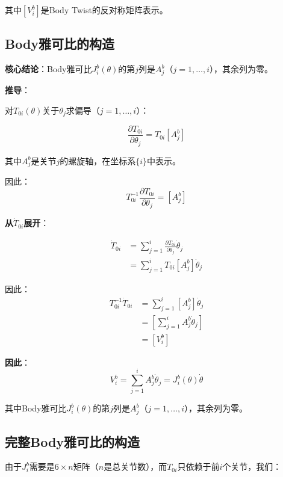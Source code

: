 \documentclass[12pt,a4paper]{article}
\begin{document}
其中$[V_i^b]$是Body Twist的反对称矩阵表示。

\subsection{Body雅可比的构造}

\textbf{核心结论}：Body雅可比$J_i^b(\theta)$的第$j$列是$A_j^b$（$j = 1, \ldots, i$），其余列为零。

\textbf{推导}：

对$T_{0i}(\theta)$关于$\theta_j$求偏导（$j = 1, \ldots, i$）：

\begin{equation}
\frac{\partial T_{0i}}{\partial \theta_j} = T_{0i} [A_j^b]
\label{eq:partial_T}
\end{equation}

其中$A_j^b$是关节$j$的螺旋轴，在坐标系$\{i\}$中表示。

因此：
\begin{equation}
T_{0i}^{-1} \frac{\partial T_{0i}}{\partial \theta_j} = [A_j^b]
\end{equation}

\textbf{从$\dot{T}_{0i}$展开}：

\begin{align}
\dot{T}_{0i} &= \sum_{j=1}^{i} \frac{\partial T_{0i}}{\partial \theta_j} \dot{\theta}_j \\
&= \sum_{j=1}^{i} T_{0i} [A_j^b] \dot{\theta}_j
\end{align}

因此：
\begin{align}
T_{0i}^{-1} \dot{T}_{0i} &= \sum_{j=1}^{i} [A_j^b] \dot{\theta}_j \\
&= \left[ \sum_{j=1}^{i} A_j^b \dot{\theta}_j \right] \\
&= [V_i^b]
\end{align}

\textbf{因此}：
\begin{equation}
V_i^b = \sum_{j=1}^{i} A_j^b \dot{\theta}_j = J_i^b(\theta) \dot{\theta}
\end{equation}

其中Body雅可比$J_i^b(\theta)$的第$j$列是$A_j^b$（$j = 1, \ldots, i$），其余列为零。

\subsection{完整Body雅可比的构造}

由于$J_i^b$需要是$6 \times n$矩阵（$n$是总关节数），而$T_{0i}$只依赖于前$i$个关节，我们：
\end{document}
